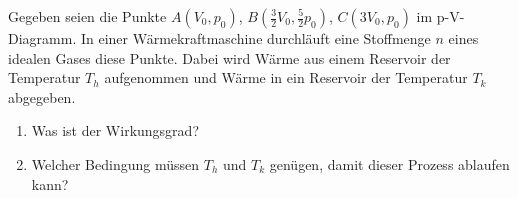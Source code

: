 \begin{Exercise}[label = Wärmekraftmaschine, origin = {4. Runde zur 46. IPhO 2015}, title = Wärmekraftmaschine, difficulty = 3]
Gegeben seien die Punkte $A(V_0,p_0)$, $B(\frac{3}{2}V_0,\frac{5}{2}	p_0)$, $C(3V_0,p_0)$ im p-V-Diagramm. In einer Wärmekraftmaschine durchläuft eine Stoffmenge $n$ eines idealen Gases diese Punkte. Dabei wird Wärme aus einem Reservoir der Temperatur $T_h$ aufgenommen und Wärme in ein Reservoir der Temperatur $T_k$ abgegeben.
\begin{enumerate}
\item Was ist der Wirkungsgrad?
\item Welcher Bedingung müssen $T_h$ und $T_k$ genügen, damit dieser Prozess ablaufen kann?
\end{enumerate}      	
\end{Exercise}
